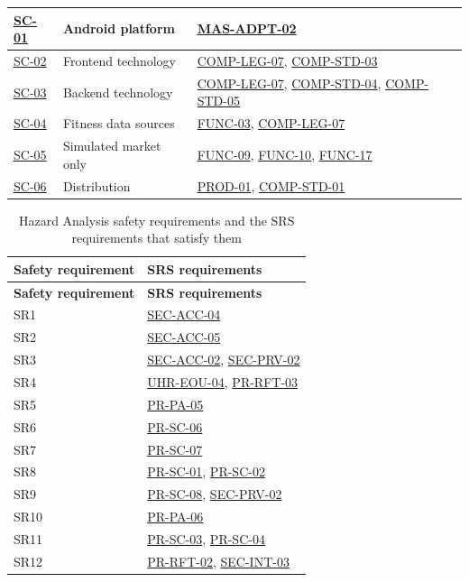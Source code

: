 \documentclass[12pt]{article}
\begin{document}
\begin{xltabular}{\textwidth}{|p{2.3cm}|p{4.2cm}|X|}
\hline
\hyperlink{req:SC-01}{SC-01} & Android platform & \hyperlink{req:MAS-ADPT-02}{MAS-ADPT-02} \\
\hline
\hyperlink{req:SC-02}{SC-02} & Frontend technology & \hyperlink{req:COMP-LEG-07}{COMP-LEG-07}, \hyperlink{req:COMP-STD-03}{COMP-STD-03} \\
\hline
\hyperlink{req:SC-03}{SC-03} & Backend technology & \hyperlink{req:COMP-LEG-07}{COMP-LEG-07}, \hyperlink{req:COMP-STD-04}{COMP-STD-04}, \hyperlink{req:COMP-STD-05}{COMP-STD-05} \\
\hline
\hyperlink{req:SC-04}{SC-04} & Fitness data sources & \hyperlink{req:FUNC-03}{FUNC-03}, \hyperlink{req:COMP-LEG-07}{COMP-LEG-07} \\
\hline
\hyperlink{req:SC-05}{SC-05} & Simulated market only & \hyperlink{req:FUNC-09}{FUNC-09}, \hyperlink{req:FUNC-10}{FUNC-10}, \hyperlink{req:FUNC-17}{FUNC-17} \\
\hline
\hyperlink{req:SC-06}{SC-06} & Distribution & \hyperlink{req:PROD-01}{PROD-01}, \hyperlink{req:COMP-STD-01}{COMP-STD-01} \\
\hline
\end{xltabular}

\begin{xltabular}{\textwidth}{|p{3.6cm}|X|}
\caption{Hazard Analysis safety requirements and the SRS requirements that satisfy them}\label{tab:trace-ha}\\
\hline
\textbf{Safety requirement} & \textbf{SRS requirements} \\
\hline
\endfirsthead
\hline
\textbf{Safety requirement} & \textbf{SRS requirements} \\
\hline
\endhead
SR1 & \hyperlink{req:SEC-ACC-04}{SEC-ACC-04} \\
\hline
SR2 & \hyperlink{req:SEC-ACC-05}{SEC-ACC-05} \\
\hline
SR3 & \hyperlink{req:SEC-ACC-02}{SEC-ACC-02}, \hyperlink{req:SEC-PRV-02}{SEC-PRV-02} \\
\hline
SR4 & \hyperlink{req:UHR-EOU-04}{UHR-EOU-04}, \hyperlink{req:PR-RFT-03}{PR-RFT-03} \\
\hline
SR5 & \hyperlink{req:PR-PA-05}{PR-PA-05} \\
\hline
SR6 & \hyperlink{req:PR-SC-06}{PR-SC-06} \\
\hline
SR7 & \hyperlink{req:PR-SC-07}{PR-SC-07} \\
\hline
SR8 & \hyperlink{req:PR-SC-01}{PR-SC-01}, \hyperlink{req:PR-SC-02}{PR-SC-02} \\
\hline
SR9 & \hyperlink{req:PR-SC-08}{PR-SC-08}, \hyperlink{req:SEC-PRV-02}{SEC-PRV-02} \\
\hline
SR10 & \hyperlink{req:PR-PA-06}{PR-PA-06} \\
\hline
SR11 & \hyperlink{req:PR-SC-03}{PR-SC-03}, \hyperlink{req:PR-SC-04}{PR-SC-04} \\
\hline
SR12 & \hyperlink{req:PR-RFT-02}{PR-RFT-02}, \hyperlink{req:SEC-INT-03}{SEC-INT-03} \\
\hline
\end{xltabular}
\normalsize
\end{document}
